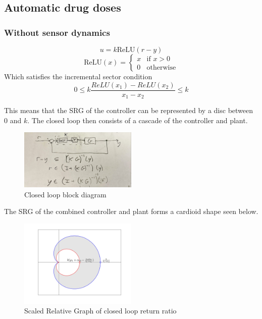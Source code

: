 \documentclass{article}
\begin{document}
\subsection{Automatic drug doses}

\subsubsection{Without sensor dynamics}

\begin{equation}
    u = k \text{ReLU}(r - y)
\end{equation}
\begin{equation}
    \text{ReLU}(x) = \begin{cases}
        x & \text{if } x > 0 \\
        0 & \text{otherwise}
    \end{cases}
\end{equation}
Which satisfies the incremental sector condition
\begin{equation}
    0 \leq k \frac{ReLU(x_1) - ReLU(x_2)}{x_1 - x_2} \leq k
\end{equation}

This means that the SRG of the controller can be represented by a disc between 0 and $k$.
The closed loop then consists of a cascade of the controller and plant.

\begin{figure}[H]
    \centering
    \includegraphics[width=0.5\textwidth]{figures/closed_loop.jpg}
    \caption{Closed loop block diagram}
\end{figure}
The SRG of the combined controller and plant forms a cardioid shape seen below.

\begin{figure}[H]
    \centering
    \includegraphics[width=0.5\textwidth]{figures/closed_loop_return_ratio.png}
    \caption{Scaled Relative Graph of closed loop return ratio}
    \label{fig:return_ratio_srg}
\end{figure}
\end{document}
